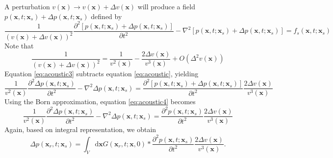 A perturbation $v(\textbf{x})\rightarrow v(\textbf{x})+\Delta v(\textbf{x})$ will produce a field $p(\textbf{x},t;\textbf{x}_s)+\Delta p(\textbf{x},t;\textbf{x}_s)$ defined by
\begin{equation}\label{eq:acoustic3}
\frac{1}{(v(\textbf{x})+\Delta v(\textbf{x}))^2}\frac{\partial^2 [p(\textbf{x},t;\textbf{x}_s)+\Delta p(\textbf{x},t;\textbf{x}_s)]}{\partial t^2}
-\nabla^2 [p(\textbf{x},t; \textbf{x}_s)+\Delta p(\textbf{x},t;\textbf{x}_s)]
=f_s(\textbf{x},t;\textbf{x}_s)
\end{equation}
Note that
\begin{equation}
\frac{1}{(v(\textbf{x})+\Delta v(\textbf{x}))^2}
=\frac{1}{v^2(\textbf{x})}-\frac{2\Delta v(\textbf{x})}{v^3(\textbf{x})}+O(\Delta^2 v(\textbf{x}))
\end{equation}
Equation \eqref{eq:acoustic3} subtracts equation \eqref{eq:acoustic}, yielding
\begin{equation}\label{eq:acoustic4}
\frac{1}{v^2(\textbf{x})}\frac{\partial^2 \Delta p(\textbf{x},t;\textbf{x}_s)}{\partial t^2}
-\nabla^2 \Delta p(\textbf{x},t;\textbf{x}_s)=
\frac{\partial^2 [p(\textbf{x},t;\textbf{x}_s)+\Delta p(\textbf{x},t;\textbf{x}_s)]}{\partial t^2}\frac{2\Delta v(\textbf{x})}{v^3(\textbf{x})}
\end{equation}
Using the Born approximation, equation \eqref{eq:acoustic4} becomes
\begin{equation}\label{eq:acoustic5}
\frac{1}{v^2(\textbf{x})}\frac{\partial^2 \Delta p(\textbf{x},t;\textbf{x}_s)}{\partial t^2}
-\nabla^2 \Delta p(\textbf{x},t;\textbf{x}_s)=
\frac{\partial^2 p(\textbf{x},t;\textbf{x}_s)}{\partial t^2}\frac{2\Delta v(\textbf{x})}{v^3(\textbf{x})}
\end{equation}
Again, based on integral representation, we obtain
\begin{equation}\label{eq:frechet}
\Delta p(\textbf{x}_r,t; \textbf{x}_s)=\int_V \mathrm{d}\textbf{x} G(\textbf{x}_r,t;\textbf{x},0)*
\frac{\partial^2 p(\textbf{x},t;\textbf{x}_s)}{\partial t^2}\frac{2\Delta v(\textbf{x})}{v^3(\textbf{x})}.
\end{equation}

\label{app:gradient}

